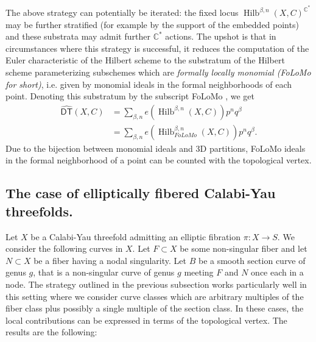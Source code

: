 \documentclass[12pt]{amsart}
\newcommand{\cnums} {{\mathbb C}}          %
\theoremstyle{definition}
\newcommand{\DThat}{\operatorname{\widehat{\mathsf{DT}}}}
\newcommand{\HilbBetan}{\operatorname{Hilb}^{\beta ,n}}
\newcommand{\folomo}{{FoLoMo }}
\begin{document}
The above strategy can potentially be iterated: the fixed locus
$\HilbBetan (X,C)^{\cnums^{*}}$ may be further stratified (for example
by the support of the embedded points) and these substrata may admit
further $\cnums^{*}$ actions. The upshot is that in circumstances
where this strategy is successful, it reduces the computation of the
Euler characteristic of the Hilbert scheme to the substratum of the
Hilbert scheme parameterizing subschemes which are \emph{formally
locally monomial ({\folomo } for short)}, i.e. given by monomial
ideals in the formal neighborhoods of each point. Denoting this
substratum by the subscript \folomo, we get
\begin{align*}
\DThat (X,C)&= \sum_{\beta ,n} e\left(\HilbBetan (X,C) \right) p^{n}q^{\beta }\\
&= \sum_{\beta ,n} e\left(\HilbBetan_{\folomo } (X,C) \right) p^{n}q^{\beta }.
\end{align*}
Due to the bijection between monomial ideals and 3D partitions,
\folomo ideals in the formal neighborhood of a point can be counted
with the topological vertex.


\subsection{The case of elliptically fibered Calabi-Yau threefolds.}

Let $X$ be a Calabi-Yau threefold admitting an elliptic fibration $\pi
:X\to S$. We consider the following curves in $X$. Let $F\subset X$ be
some non-singular fiber and let $N\subset X$ be a fiber having a nodal
singularity. Let $B$ be a smooth section curve of genus $g$, that is a
non-singular curve of genus $g$ meeting $F$ and $N$ once each in a
node. The strategy outlined in the previous subsection works
particularly well in this setting where we consider curve classes
which are arbitrary multiples of the fiber class plus possibly a
single multiple of the section class. In these cases, the local
contributions can be expressed in terms of the topological vertex. The
results are the following:
\end{document}
